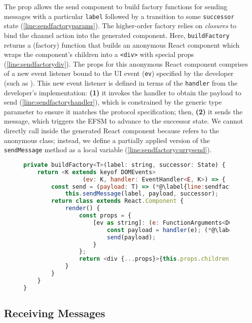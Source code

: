 The prop allows the send component to build factory functions
for sending messages with a particular \texttt{label}
followed by a transition to some \texttt{successor} state
(\cref{line:sendfactoryparams}).
The higher-order factory relies on \textit{closures}
to bind the channel action into the generated component.
Here, \texttt{buildFactory} returns a (factory) function that
builds an anonymous React component which wraps the 
component's children into a \texttt{<div>} with special props 
(\cref{line:sendfactorydiv}).
The props for this anonymous React component comprises of a new
event listener bound to the UI event (\texttt{ev})
specified by the developer (such as ).
This new event listener is defined in terms of the
\texttt{handler} from the developer's implementation:
\textbf{(1)} it invokes the handler to obtain the payload to send 
(\cref{line:sendfactoryhandler}), which is constrained by
the generic type parameter to ensure it matches the protocol specification;
then, \textbf{(2)} it sends the message, which triggers the EFSM
to advance to the successor state.
We cannot directly call  inside
the generated React component because  refers
to the anonymous class; instead, we define a partially applied
version of the \texttt{sendMessage} method as a local variable 
(\cref{line:sendfactorycurrysend}).

\begin{figure}[!h]
\begin{lstlisting}[language=javascript,tabsize=2]
private buildFactory<T>(label: string, successor: State) { (*@\label{line:sendfactoryparams}@*)
	return <K extends keyof DOMEvents>
				 (ev: K, handler: EventHandler<E, K>) => {
		const send = (payload: T) => (*@\label{line:sendfactorycurrysend}@*)
			this.sendMessage(label, payload, successor);
		return class extends React.Component {
			render() {
				const props = {
					[ev as string]: (e: FunctionArguments<DOMEvents[K]>) => {
						const payload = handler(e); (*@\label{line:sendfactoryhandler}@*)
						send(payload);
					}
				};
				return <div {...props}>{this.props.children}</div> (*@\label{line:sendfactorydiv}@*)
			}		
		}	
	}
}
\end{lstlisting}
\label{lst:reactsendfactory}
\end{figure}

\subsection{Receiving Messages}
\label{subsection:reactruntimereceive}

